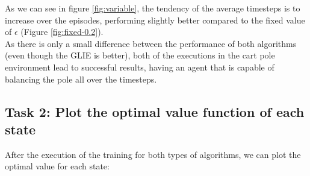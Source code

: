 \documentclass[12pt]{article}
\begin{document}
As we can see in figure \ref{fig:variable}, the tendency of the average timesteps is to increase over the episodes, performing slightly better compared to the fixed value of $\epsilon$ (Figure \ref{fig:fixed-0.2}). \\

As there is only a small difference between the performance of both algorithms (even though the GLIE is better), both of the executions in the cart pole environment lead to successful results, having an agent that is capable of balancing the pole all over the timesteps.

\subsection{Task 2: Plot the optimal value function of each state}

After the execution of the training for both types of algorithms, we can plot the optimal value for each state:
\end{document}
